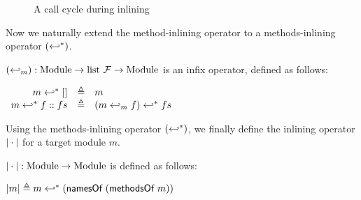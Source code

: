 \begin{figure}[t]
  \begin{subfigure}[b]{0.5\textwidth}
  \end{subfigure}
  \begin{subfigure}[b]{0.5\textwidth}
  \end{subfigure}
  \caption{A call cycle during inlining}
  \label{ex-inlining-callcycle}
\end{figure}

Now we naturally extend the method-inlining operator to a
methods-inlining operator $(\hookleftarrow^{\ast})$.

\begin{definition}
  \label{def-inlinedms}
  $(\hookleftarrow_{m}) : \textrm{Module} \to \textrm{list}\ \mathcal{F}{}
  \to \textrm{Module}$ is an infix operator, defined as follows:
  \begin{center}
    \begin{math}
      \begin{array}{rcl}
        m \hookleftarrow^{\ast}{} [] & \triangleq & m \\
        m \hookleftarrow^{\ast}{} f::fs & \triangleq & (m \hookleftarrow_{m}{} f) \hookleftarrow^{\ast}{} fs \\
      \end{array}
    \end{math}
  \end{center}
\end{definition}

Using the methods-inlining operator $(\hookleftarrow^{\ast})$, we finally define the
inlining operator $| \cdot |$ for a target module $m$.

\begin{definition}
  \label{def-inline}
  $| \cdot | : \textrm{Module} \to \textrm{Module}$ is defined as
  follows:
  \begin{center}
    \begin{math}
      | m | \triangleq m \hookleftarrow^{\ast}{} (\textsf{namesOf}\ (\textsf{methodsOf}\ m))
    \end{math}
  \end{center}
\end{definition}

